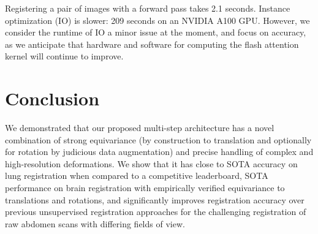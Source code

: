 
Registering a pair of images with a forward pass takes 2.1 seconds. Instance optimization (IO) is slower: 209 seconds on an NVIDIA A100 GPU. %
However, we consider the runtime of IO a minor issue at the moment, and focus on accuracy, as we anticipate that hardware and software for computing the flash attention kernel will continue to improve.

\section{Conclusion}
We demonstrated that our proposed multi-step architecture has a novel combination of strong equivariance (by construction to translation and optionally for rotation by judicious data augmentation) and precise handling of complex and high-resolution deformations. We show that it has close to SOTA accuracy on lung registration when compared to a competitive leaderboard, SOTA performance on brain registration with empirically verified equivariance to translations and rotations, and significantly improves registration accuracy over previous unsupervised registration approaches for the challenging registration of raw abdomen scans with differing fields of view. %


